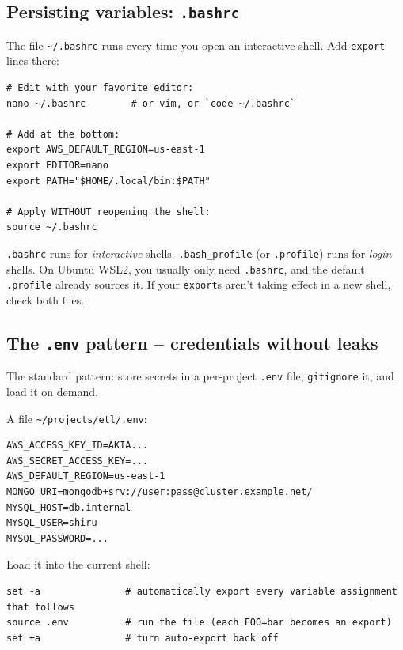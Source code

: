 \documentclass[11pt,a4paper]{article}
\begin{document}
\subsection*{Persisting variables: \texttt{.bashrc}}

The file \texttt{\textasciitilde{}/.bashrc} runs every time you
open an interactive shell. Add \texttt{export} lines there:

\begin{lstlisting}[style=bashstyle]
# Edit with your favorite editor:
nano ~/.bashrc        # or vim, or `code ~/.bashrc`

# Add at the bottom:
export AWS_DEFAULT_REGION=us-east-1
export EDITOR=nano
export PATH="$HOME/.local/bin:$PATH"

# Apply WITHOUT reopening the shell:
source ~/.bashrc
\end{lstlisting}

\begin{gotcha}
\texttt{.bashrc} runs for \emph{interactive} shells.
\texttt{.bash\_profile} (or \texttt{.profile}) runs for \emph{login}
shells. On Ubuntu WSL2, you usually only need \texttt{.bashrc}, and
the default \texttt{.profile} already sources it. If your
\texttt{export}s aren't taking effect in a new shell, check both
files.
\end{gotcha}

\subsection*{The \texttt{.env} pattern -- credentials without leaks}

The standard pattern: store secrets in a per-project \texttt{.env}
file, \texttt{gitignore} it, and load it on demand.

A file \texttt{\textasciitilde{}/projects/etl/.env}:

\begin{lstlisting}[style=bashstyle]
AWS_ACCESS_KEY_ID=AKIA...
AWS_SECRET_ACCESS_KEY=...
AWS_DEFAULT_REGION=us-east-1
MONGO_URI=mongodb+srv://user:pass@cluster.example.net/
MYSQL_HOST=db.internal
MYSQL_USER=shiru
MYSQL_PASSWORD=...
\end{lstlisting}

Load it into the current shell:

\begin{lstlisting}[style=bashstyle]
set -a               # automatically export every variable assignment that follows
source .env          # run the file (each FOO=bar becomes an export)
set +a               # turn auto-export back off
\end{lstlisting}
\end{document}
